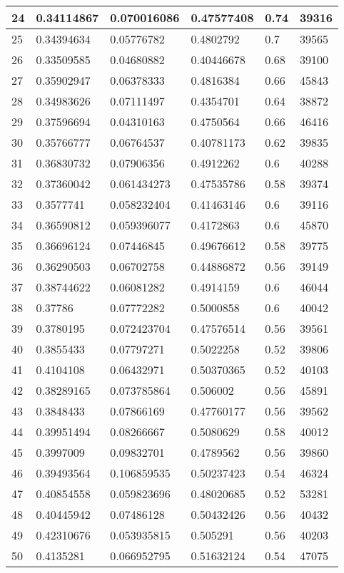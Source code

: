\begin{longtable}{|l|l|l|l|l|l|}
24 & 0.34114867 & 0.070016086 & 0.47577408 & 0.74 & 39316 \\ \hline 
25 & 0.34394634 & 0.05776782 & 0.4802792 & 0.7 & 39565 \\ \hline 
26 & 0.33509585 & 0.04680882 & 0.40446678 & 0.68 & 39100 \\ \hline 
27 & 0.35902947 & 0.06378333 & 0.4816384 & 0.66 & 45843 \\ \hline 
28 & 0.34983626 & 0.07111497 & 0.4354701 & 0.64 & 38872 \\ \hline 
29 & 0.37596694 & 0.04310163 & 0.4750564 & 0.66 & 46416 \\ \hline 
30 & 0.35766777 & 0.06764537 & 0.40781173 & 0.62 & 39835 \\ \hline 
31 & 0.36830732 & 0.07906356 & 0.4912262 & 0.6 & 40288 \\ \hline 
32 & 0.37360042 & 0.061434273 & 0.47535786 & 0.58 & 39374 \\ \hline 
33 & 0.3577741 & 0.058232404 & 0.41463146 & 0.6 & 39116 \\ \hline 
34 & 0.36590812 & 0.059396077 & 0.4172863 & 0.6 & 45870 \\ \hline 
35 & 0.36696124 & 0.07446845 & 0.49676612 & 0.58 & 39775 \\ \hline 
36 & 0.36290503 & 0.06702758 & 0.44886872 & 0.56 & 39149 \\ \hline 
37 & 0.38744622 & 0.06081282 & 0.4914159 & 0.6 & 46044 \\ \hline 
38 & 0.37786 & 0.07772282 & 0.5000858 & 0.6 & 40042 \\ \hline 
39 & 0.3780195 & 0.072423704 & 0.47576514 & 0.56 & 39561 \\ \hline 
40 & 0.3855433 & 0.07797271 & 0.5022258 & 0.52 & 39806 \\ \hline 
41 & 0.4104108 & 0.06432971 & 0.50370365 & 0.52 & 40103 \\ \hline 
42 & 0.38289165 & 0.073785864 & 0.506002 & 0.56 & 45891 \\ \hline 
43 & 0.3848433 & 0.07866169 & 0.47760177 & 0.56 & 39562 \\ \hline 
44 & 0.39951494 & 0.08266667 & 0.5080629 & 0.58 & 40012 \\ \hline 
45 & 0.3997009 & 0.09832701 & 0.4789562 & 0.56 & 39860 \\ \hline 
46 & 0.39493564 & 0.106859535 & 0.50237423 & 0.54 & 46324 \\ \hline 
47 & 0.40854558 & 0.059823696 & 0.48020685 & 0.52 & 53281 \\ \hline 
48 & 0.40445942 & 0.07486128 & 0.50432426 & 0.56 & 40432 \\ \hline 
49 & 0.42310676 & 0.053935815 & 0.505291 & 0.56 & 40203 \\ \hline 
50 & 0.4135281 & 0.066952795 & 0.51632124 & 0.54 & 47075 \\ \hline 
\end{longtable}